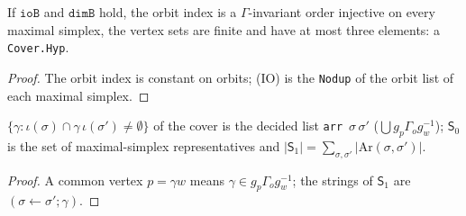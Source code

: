 \begin{theorem}\label{thm:mp-datum-hyp}
  \leanok
  If $\texttt{ioB}$ and $\texttt{dimB}$ hold, the orbit index is a $\Gamma$-invariant order injective on every maximal simplex, the
  vertex sets are finite and have at most three elements: a \texttt{Cover.Hyp}.
\end{theorem}
\begin{proof}
  \leanok
  The orbit index is constant on orbits; (IO) is the \texttt{Nodup} of the orbit list of each maximal simplex.
\end{proof}

\begin{theorem}\label{thm:mp-datum-arrows}
  \leanok
  $\{\gamma:\iota(\sigma)\cap\gamma\,\iota(\sigma')\ne\emptyset\}$ of the cover is the decided list \texttt{arr}~$\sigma\,\sigma'$
  ($\bigcup g_p\Gamma_og_w^{-1}$); $\mathsf S_0$ is the set of maximal-simplex representatives and
  $\lvert\mathsf S_1\rvert=\sum_{\sigma,\sigma'}\lvert\mathrm{Ar}(\sigma,\sigma')\rvert$.
\end{theorem}
\begin{proof}
  \leanok
  A common vertex $p=\gamma w$ means $\gamma\in g_p\Gamma_og_w^{-1}$; the strings of $\mathsf S_1$ are $(\sigma\leftarrow\sigma';\gamma)$.
\end{proof}

